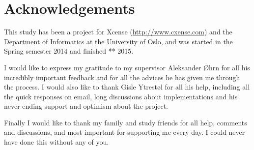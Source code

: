 \chapter*{Acknowledgements}
This study has been a project for Xcense (\url{http://www.cxense.com}) and the Department of Informatics at the University of Oslo, and was started in the Spring semester 2014 and finished ** 2015. 

I would like to express my gratitude to my supervisor Aleksander Øhrn for all his incredibly important feedback and for all the advices he has given me through the process. 
I would also like to thank Gisle Ytrestøl for all his help, including all the quick responses on email, long discussions about implementations and his never-ending support and optimism about the project. 

Finally I would like to thank my family and study friends for all help, comments and discussions, and most important for supporting me every day. I could never have done this without any of you. 
